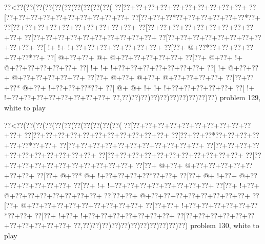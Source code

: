 \vbox{\vbox{\goo
\0??<\0??(\0??(\0??(\0??(\0??(\0??(\0??(\0??(\0??(\0??(
\0??[\0??+\0??+\0??+\0??+\0??+\0??+\0??+\0??+\0??+\0??+
\0??[\0??+\0??+\0??+\0??+\0??+\0??+\0??+\0??+\0??+\0??+
\0??[\0??+\0??+\0??*\0??+\0??+\0??+\0??+\0??+\0??*\0??+
\0??[\0??+\0??+\0??+\0??+\0??+\0??+\0??+\0??+\0??+\0??+
\0??[\0??+\0??+\0??+\0??+\0??+\0??+\0??+\0??+\0??+\0??+
\0??[\0??+\0??+\0??+\0??+\0??+\0??+\0??+\0??+\0??+\0??+
\0??[\0??+\0??+\0??+\0??+\0??+\0??+\0??+\0??+\0??+\0??+
\0??[\- !+\- !+\- !+\0??+\0??+\0??+\0??+\0??+\0??+\0??+
\0??[\0??+\- @+\0??*\0??+\0??+\0??+\0??+\0??+\0??*\0??+
\0??[\- @+\0??+\0??+\- @+\- @+\0??+\0??+\0??+\0??+\0??+
\0??[\0??+\- @+\0??+\- !+\- @+\0??+\0??+\0??+\0??+\0??+
\0??[\- !+\- !+\- !+\0??+\0??+\0??+\0??+\0??+\0??+\0??+
\0??[\- !+\- @+\0??+\0??+\- @+\0??+\0??+\0??+\0??+\0??+
\0??[\0??+\- @+\0??+\- @+\0??+\- @+\0??+\0??+\0??+\0??+
\0??[\0??+\0??+\0??*\- @+\0??+\- !+\0??+\0??+\0??*\0??+
\0??[\- @+\- @+\- !+\- !+\- !+\0??+\0??+\0??+\0??+\0??+
\0??[\- !+\- !+\0??+\0??+\0??+\0??+\0??+\0??+\0??+\0??+
\0??,\0??)\0??)\0??)\0??)\0??)\0??)\0??)\0??)\0??)\0??)
}
\hfil problem 129, white to play\hfil\break
}

\vbox{\vbox{\goo
\0??<\0??(\0??(\0??(\0??(\0??(\0??(\0??(\0??(\0??(\0??(\0??(
\0??[\0??+\0??+\0??+\0??+\0??+\0??+\0??+\0??+\0??+\0??+\0??+
\0??[\0??+\0??+\0??+\0??+\0??+\0??+\0??+\0??+\0??+\0??+\0??+
\0??[\0??+\0??+\0??*\0??+\0??+\0??+\0??+\0??+\0??*\0??+\0??+
\0??[\0??+\0??+\0??+\0??+\0??+\0??+\0??+\0??+\0??+\0??+\0??+
\0??[\0??+\0??+\0??+\0??+\0??+\0??+\0??+\0??+\0??+\0??+\0??+
\0??[\0??+\0??+\0??+\0??+\0??+\0??+\0??+\0??+\0??+\0??+\0??+
\0??[\0??+\0??+\0??+\0??+\0??+\0??+\0??+\0??+\0??+\0??+\0??+
\0??[\0??+\- @+\0??+\- @+\0??+\0??+\0??+\0??+\0??+\0??+\0??+
\0??[\0??+\- @+\0??*\- @+\- !+\0??+\0??+\0??+\0??*\0??+\0??+
\0??[\0??+\- @+\- !+\0??+\- @+\0??+\0??+\0??+\0??+\0??+\0??+
\0??[\0??+\- !+\- !+\0??+\0??+\0??+\0??+\0??+\0??+\0??+\0??+
\0??[\0??+\- !+\0??+\- @+\0??+\0??+\0??+\0??+\0??+\0??+\0??+
\0??[\0??+\0??+\- @+\0??+\0??+\0??+\0??+\0??+\0??+\0??+\0??+
\0??[\0??+\- @+\0??+\0??+\0??+\0??+\0??+\0??+\0??+\0??+\0??+
\0??[\0??+\0??+\- !+\0??+\0??+\0??+\0??+\0??+\0??*\0??+\0??+
\0??[\0??+\- !+\0??+\- !+\0??+\0??+\0??+\0??+\0??+\0??+\0??+
\0??[\0??+\0??+\0??+\0??+\0??+\0??+\0??+\0??+\0??+\0??+\0??+
\0??,\0??)\0??)\0??)\0??)\0??)\0??)\0??)\0??)\0??)\0??)\0??)
}
\hfil problem 130, white to play\hfil\break
}

